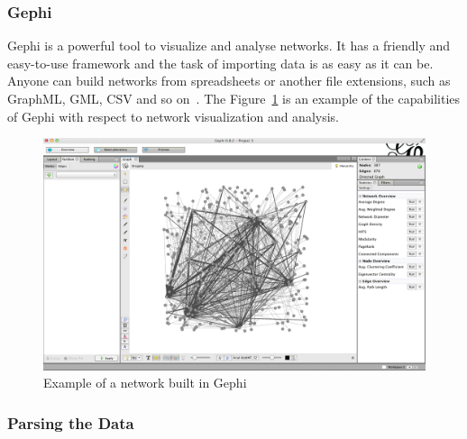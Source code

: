 \documentclass[12pt]{article}
\begin{document}
\subsubsection{Gephi}\label{sec: gephiSection}

Gephi is a powerful tool to visualize and analyse networks. It has a friendly and easy-to-use framework and the task of importing data is as easy as it can be. Anyone can build networks from spreadsheets or another file extensions, such as GraphML, GML, CSV and so on~\cite{gephi}. The Figure~\ref{fig:gephi} is an example of the capabilities of Gephi with respect to network visualization and analysis.

\begin{figure}[H]
	\centering
	\includegraphics[scale=0.35]{gephi.png}
	\caption{Example of a network built in Gephi}
	\label{fig:gephi}
\end{figure}
\subsubsection{Parsing the Data}\label{sec: parser}
\end{document}
